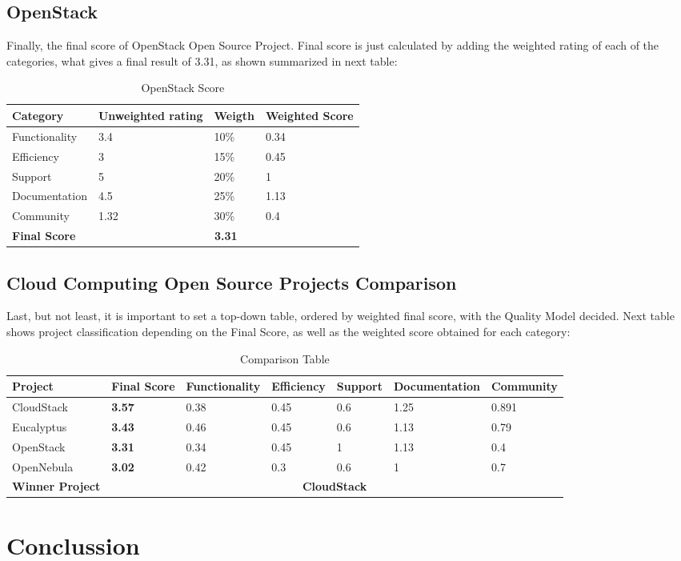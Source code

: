 \documentclass[11pt]{article}
\begin{document}
\subsection{OpenStack}
Finally, the final score of OpenStack Open Source Project. Final score is just calculated by adding the weighted rating of each of the categories, what gives a final result of 3.31, as shown summarized in next table:
\begin{table}[H]
  \begin{center}
    \begin{tabular}{ | p{3cm} | p{2.5cm} | p{1.5cm} | p{2cm} | }
    \toprule
    \textbf{Category} & \textbf{Unweighted rating} & \textbf{Weigth} & \textbf{Weighted Score}\\
    \hline
    Functionality & 3.4 & 10\% & 0.34\\
    \hline
    Efficiency & 3 & 15\% & 0.45\\
    \hline
    Support & 5 & 20\% & 1\\
    \hline
    Documentation & 4.5 & 25\% & 1.13\\
    \hline
    Community & 1.32 & 30\% & 0.4\\
    \midrule
    \textbf{Final Score} & \multicolumn {3}{c|}{\textbf{3.31}}\\
    \bottomrule
    \end{tabular}
    \caption{OpenStack Score}
    \label{tab:openstack_score}
  \end{center}
\end{table}

\subsection{Cloud Computing Open Source Projects Comparison}
Last, but not least, it is important to set a top-down table, ordered by weighted final score, with the Quality Model decided. Next table shows project classification depending on the Final Score, as well as the weighted score obtained for each category:
\begin{table}[H]
  \begin{center}
    \begin{tabular}{ | p{2.5cm} | p{1cm} | p{2.2cm} | p{1.8cm} | p{1.7cm} | p{2.4cm} | p{1.9cm} | }
    \toprule
    Project & \textbf{Final Score} & Functionality & Efficiency & Support & Documentation & Community\\
    \hline
    CloudStack & \textbf{3.57} & 0.38 & 0.45 & 0.6 & 1.25 & 0.891\\
    \hline
    Eucalyptus & \textbf{3.43} & 0.46 & 0.45 & 0.6 & 1.13 & 0.79\\
    \hline
    OpenStack & \textbf{3.31} & 0.34 & 0.45 & 1 & 1.13 & 0.4\\
    \hline
    OpenNebula & \textbf{3.02} & 0.42 & 0.3 & 0.6 & 1 & 0.7\\
    \midrule
    \textbf{Winner Project} & \multicolumn {6}{c|}{\textbf{CloudStack}}\\
    \bottomrule
    \end{tabular}
    \caption{Comparison Table}
    \label{tab:comparison_table}
  \end{center}
\end{table}

\section{Conclussion} \label{sec:conclussion}


{}
\end{document}
